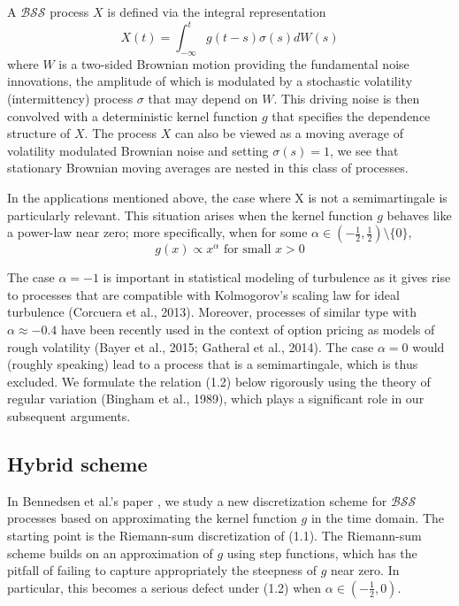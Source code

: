 \documentclass[12pt]{article}
\numberwithin{equation}{section}
\begin{document}
A $\mathcal{BSS}$ process $X$ is defined via the integral representation
\begin{equation}
  X(t) = \int_{-\infty}^{t} g(t-s)\sigma(s)dW(s)
\end{equation}
where $W$ is a two-sided Brownian motion providing the fundamental noise innovations, the amplitude of which is modulated by a stochastic volatility (intermittency) process $\sigma$ that may depend on $W$. This driving noise is then convolved with a deterministic kernel function $g$ that specifies the dependence structure of $X$. The process $X$ can also be viewed as a moving average of volatility modulated Brownian noise and setting $\sigma(s) = 1$, we see that stationary Brownian moving averages are nested in this class of processes.
  
In the applications mentioned above, the case where X is not a semimartingale is particularly relevant. This situation arises when the kernel function $g$ behaves like a power-law near zero; more specifically, when for some $\alpha \in (-\frac{1}{2}, \frac{1}{2}) \setminus \{0\}$,
\begin{equation}
  g(x) \propto x^\alpha \text{ for small } x>0
\end{equation}

The case $\alpha = −1$ is important in statistical modeling of turbulence as it gives rise to processes that are compatible with Kolmogorov’s scaling law for ideal turbulence (Corcuera et al., 2013). Moreover, processes of similar type with $\alpha ≈ −0.4$ have been recently used in the context of option pricing as models of rough volatility (Bayer et al., 2015; Gatheral et al., 2014). The case $\alpha = 0$ would (roughly speaking) lead to a process that is a semimartingale, which is thus excluded. We formulate the relation (1.2) below rigorously using the theory of regular variation (Bingham et al., 1989), which plays a significant role in our subsequent arguments.

\subsection{Hybrid scheme}
    
In Bennedsen et al.'s paper \cite{bennedsen2015hybrid}, we study a new discretization scheme for $\mathcal{BSS}$ processes based on approximating the kernel function $g$ in the time domain. The starting point is the Riemann-sum discretization of (1.1). The Riemann-sum scheme builds on an approximation of $g$ using step functions, which has the pitfall of failing to capture appropriately the steepness of $g$ near zero. In particular, this becomes a serious defect under (1.2) when $\alpha \in (-\frac{1}{2}, 0)$. 
\end{document}
